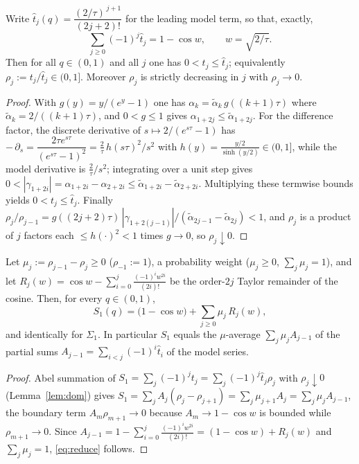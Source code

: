 \begin{lemma}\label{lem:dom}
Write $\hat t_j(q)=\dfrac{(2/\tau)^{\,j+1}}{(2j+2)!}$ for the leading model term, so
that, exactly,
\[
  \sum_{j\ge0}(-1)^{j}\hat t_j=1-\cos w,\qquad w=\sqrt{2/\tau}.
\]
Then for all $q\in(0,1)$ and all $j$ one has $0<t_j\le\hat t_j$; equivalently
$\rho_j:=t_j/\hat t_j\in(0,1]$. Moreover $\rho_j$ is strictly decreasing in $j$
with $\rho_j\to0$.
\end{lemma}

\begin{proof}
With $g(y)=y/(e^{y}-1)$ one has $\alpha_k=\tilde\alpha_k\,g((k{+}1)\tau)$ where
$\tilde\alpha_k=2/((k{+}1)\tau)$, and $0<g\le1$ gives $\alpha_{1+2j}\le\tilde
\alpha_{1+2j}$. For the difference factor, the discrete derivative of
$s\mapsto 2/(e^{s\tau}-1)$ has $-\,\partial_s=\dfrac{2\tau e^{s\tau}}{(e^{s\tau}-1)^2}
=\tfrac{2}{\tau}\,h(s\tau)^2/s^2$ with $h(y)=\tfrac{y/2}{\sinh(y/2)}\in(0,1]$, while the
model derivative is $\tfrac{2}{\tau}/s^{2}$; integrating over a unit step gives
$0<|\gamma_{1+2i}|=\alpha_{1+2i}-\alpha_{2+2i}\le\tilde\alpha_{1+2i}-\tilde
\alpha_{2+2i}$. Multiplying these termwise bounds yields $0<t_j\le\hat t_j$.
Finally $\rho_j/\rho_{j-1}=g((2j{+}2)\tau)\,|\gamma_{1+2(j-1)}|/(\tilde\alpha_{2j-1}
-\tilde\alpha_{2j})<1$, and $\rho_j$ is a product of $j$ factors each $\le h(\cdot)^2<1$
times $g\to0$, so $\rho_j\downarrow0$.
\end{proof}

\begin{lemma}\label{lem:reduce}
Let $\mu_j:=\rho_{j-1}-\rho_j\ge0$ \textup($\rho_{-1}:=1$\textup), a probability
weight \textup($\mu_j\ge0$, $\sum_j\mu_j=1$\textup), and let
$R_j(w)=\cos w-\sum_{i=0}^{j}\tfrac{(-1)^{i}w^{2i}}{(2i)!}$ be the order-$2j$
Taylor remainder of the cosine. Then, for every $q\in(0,1)$,
\begin{equation}\label{eq:reduce}
  S_1(q)=\bigl(1-\cos w\bigr)+\sum_{j\ge0}\mu_j\,R_j(w),
\end{equation}
and identically for $\Sigma_1$. In particular $S_1$ equals the $\mu$-average
$\sum_j\mu_j A_{j-1}$ of the partial sums $A_{j-1}=\sum_{i<j}(-1)^{i}\hat t_i$ of the
model series.
\end{lemma}

\begin{proof}
Abel summation of $S_1=\sum_j(-1)^{j}t_j=\sum_j(-1)^{j}\hat t_j\rho_j$ with
$\rho_j\downarrow0$ (Lemma~\ref{lem:dom}) gives $S_1=\sum_j A_j(\rho_j-\rho_{j+1})
=\sum_j\mu_{j+1}A_j=\sum_j\mu_jA_{j-1}$, the boundary term $A_m\rho_{m+1}\to0$ because
$A_m\to1-\cos w$ is bounded while $\rho_{m+1}\to0$. Since
$A_{j-1}=1-\sum_{i=0}^{j}\tfrac{(-1)^iw^{2i}}{(2i)!}=(1-\cos w)+R_j(w)$ and
$\sum_j\mu_j=1$, \eqref{eq:reduce} follows. \end{proof}

